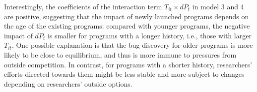 Interestingly, the coefficients of the interaction term $T_{it} \times dP_t$ in model 3 and 4 are positive, suggesting that the impact of newly launched programs depends on the age of the existing programs: compared with younger programs, the negative impact of $dP_t$ is smaller for programs with a longer history, i.e., those with larger $T_{it}$. One possible explanation is that the bug discovery for older programs is more likely to be close to equilibrium, and thus is more immune to pressures from outside competition. In contrast, for programs with a shorter history, researchers' efforts directed towards them might be less stable and more subject to changes depending on researchers' outside options.


